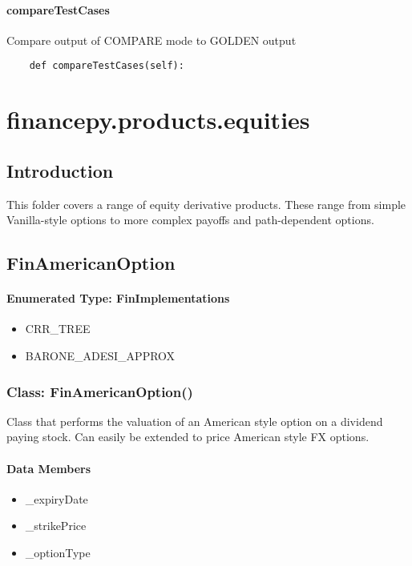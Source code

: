 \documentclass[twoside,11pt]{book}
\begin{document}
\subsubsection*{{\bf compareTestCases}}
Compare output of COMPARE mode to GOLDEN output  

\begin{lstlisting}
    def compareTestCases(self):
\end{lstlisting}


\chapter{financepy.products.equities}
\section{Introduction}

This folder covers a range of equity derivative products. These range from simple Vanilla-style options to more complex payoffs and path-dependent options. \newpage
\section{FinAmericanOption}

\subsubsection{Enumerated Type: FinImplementations}
\begin{itemize}
\item{CRR\_TREE}
\item{BARONE\_ADESI\_APPROX}
\end{itemize}

\subsection*{Class: FinAmericanOption()}
Class that performs the valuation of an American style option on a dividend paying stock. Can easily be extended to price American style FX options.  

\subsubsection*{Data Members}
\begin{itemize}
\item{\_expiryDate}
\item{\_strikePrice}
\item{\_optionType}
\end{itemize}
\end{document}
